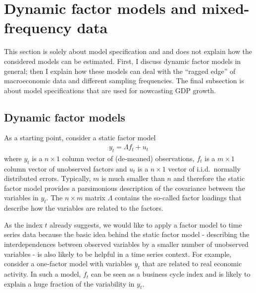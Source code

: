 \chapter{Dynamic factor models and mixed-frequency data}\label{sec:dfm}

This section is solely about model specification and and does not explain how the considered models can be estimated. First, I discuss dynamic factor models in general; then I explain how these models can deal with the ``ragged edge'' of macroeconomic data and different sampling frequencies. The final subsection is about model specifications that are used for nowcasting GDP growth.

\section{Dynamic factor models}


As a starting point, consider a static factor model
\begin{align}
y_t = \Lambda f_t + u_t \label{eq:static_fm}
\end{align}
where $y_t$ is a $n \times 1$ column vector of (de-meaned) observations, $f_t$ is a $m \times 1$ column vector of unobserved factors and $u_t$ is a $n \times 1$ vector of i.i.d.~normally distributed errors. Typically, $m$ is much smaller than $n$ and therefore the static factor model provides a parsimonious description of the covariance between the variables in $y_t$. The $n \times m$ matrix $\Lambda$ contains the so-called factor loadings that describe how the variables are related to the factors. 

As the index $t$ already suggests, we would like to apply a factor model to time series data because the basic idea behind the static factor model - describing the interdependences between observed variables by a smaller number of unobserved variables - is also likely to be helpful in a time series context. For example, consider a one-factor model with variables $y_t$ that are related to real economic activity. In such a model, $f_t$ can be seen as a business cycle index and is likely to explain a huge fraction of the variability in $y_t$. 

